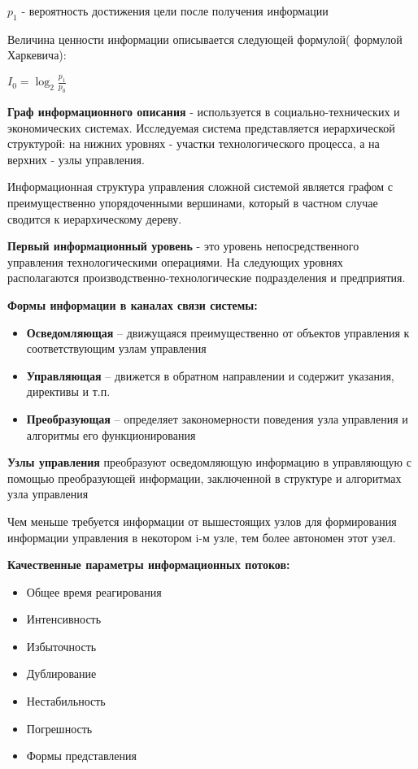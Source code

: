 \documentclass[a4paper]{article}
\begin{document}
	$ p_1 $ - вероятность достижения цели после получения информации
	
	Величина ценности информации описывается следующей формулой( формулой Харкевича):
	
	$ I_0 = \log_2 \frac{p_1}{p_0} $
	
	\textbf{Граф информационного описания} - используется в социально-технических и экономических системах. Исследуемая система представляется иерархической структурой: на нижних уровнях - участки технологического процесса, а на верхних - узлы управления.
	
	Информационная структура управления сложной системой является графом с преимущественно упорядоченными вершинами, который в частном случае сводится к иерархическому дереву.
	
	\textbf{Первый информационный уровень} - это уровень непосредственного управления технологическими операциями. На следующих уровнях располагаются производственно-технологические подразделения и предприятия.
	
	\textbf{Формы информации в каналах связи системы:}
	\begin{itemize}
		\item \textbf{Осведомляющая} – движущаяся преимущественно от объектов управления к соответствующим узлам управления
		\item \textbf{Управляющая} – движется в обратном направлении и содержит указания, директивы и т.п.
		\item \textbf{Преобразующая} – определяет закономерности поведения узла управления и алгоритмы его функционирования
	\end{itemize}

	\textbf{Узлы управления} преобразуют осведомляющую информацию в управляющую с помощью преобразующей информации, заключенной в структуре и алгоритмах узла управления
	
	Чем меньше требуется информации от вышестоящих узлов для формирования информации управления в некотором i-м узле, тем более автономен этот узел.
	
	\textbf{Качественные параметры информационных потоков:}
	\begin{itemize}
		\item Общее время реагирования
		\item Интенсивность
		\item Избыточность
		\item Дублирование
		\item Нестабильность
		\item Погрешность
		\item Формы представления
	\end{itemize}
\end{document}
